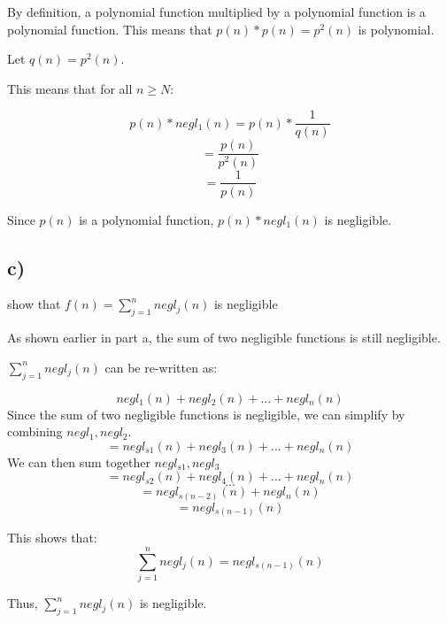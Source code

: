 \documentclass{article}
\begin{document}
By definition, a polynomial function multiplied by a polynomial function
is a polynomial function. This means that $p(n)*p(n)=p^2(n)$ is polynomial.

Let $q(n)=p^2(n)$.

This means that for all $n\geq{}N$:

$$
p(n)*negl_1(n)=p(n)*\frac{1}{q(n)}
$$
$$
=\frac{p(n)}{p^2(n)}
$$
$$
=\frac{1}{p(n)}
$$

Since $p(n)$ is a polynomial function, $p(n)*negl_1(n)$ is negligible.



\subsection*{c)}

show that $f(n)=\sum_{j=1}^{n}negl_j(n)$ is negligible

As shown earlier in part a, the sum of two negligible functions is still negligible.

$\sum_{j=1}^{n}negl_j(n)$ can be re-written as:

$$
negl_1(n)+negl_2(n)+...+negl_n(n)
$$
Since the sum of two negligible functions is negligible, we can simplify
by combining $negl_1,negl_2$.
$$
=negl_{s1}(n)+negl_3(n)+...+negl_n(n)
$$
We can then sum together $negl_{s1},negl_3$
$$
=negl_{s2}(n)+negl_4(n)+...+negl_n(n)
$$
$$
...
$$
$$
=negl_{s(n-2)}(n)+negl_n(n)
$$
$$
=negl_{s(n-1)}(n)
$$

This shows that:
$$
\sum_{j=1}^{n}negl_j(n)=negl_{s(n-1)}(n)
$$

Thus, $\sum_{j=1}^{n}negl_j(n)$ is negligible.
\end{document}

